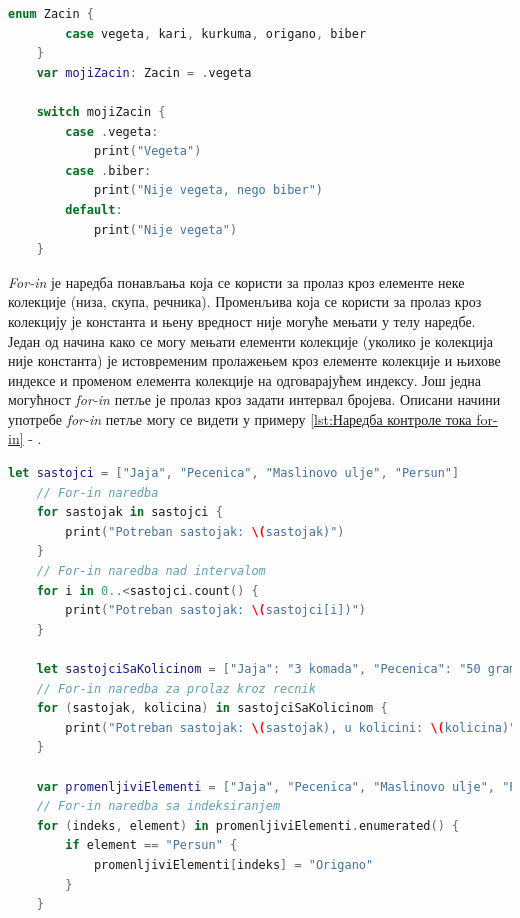 \documentclass[12pt,oneside]{memoir}
\begin{document}
\begin{lstlisting}[caption=\textit{{Наредба контроле тока switch}}, label={lst:Наредба контроле тока switch}, language=Swift, frame=single]
    enum Zacin {
        case vegeta, kari, kurkuma, origano, biber
    }
    var mojiZacin: Zacin = .vegeta
    
    switch mojiZacin {
        case .vegeta:
            print("Vegeta")
        case .biber:
            print("Nije vegeta, nego biber")
        default:
            print("Nije vegeta")
    }
\end{lstlisting}

\indent \textit{For-in} је наредба понављања која се користи за пролаз кроз елементе неке колекције (низа, скупа, речника). Променљива која се користи за пролаз кроз колекцију је константа и њену вредност није могуће мењати у телу наредбе. Један од начина како се могу мењати елементи колекције (уколико је колекција није константа) је истовременим пролажењем кроз елементе колекције и њихове индексе и променом елемента колекције на одговарајућем индексу. Још једна могућност \textit{for-in} петље је пролаз кроз задати интервал бројева. Описани начини употребе \textit{for-in} петље могу се видети у примеру \ref{lst:Наредба контроле тока for-in} - .
\begin{lstlisting}[caption=\textit{{Наредба контроле тока for-in}}, label={lst:Наредба контроле тока for-in}, language=Swift, frame=single]
    let sastojci = ["Jaja", "Pecenica", "Maslinovo ulje", "Persun"]
    // For-in naredba
    for sastojak in sastojci {
        print("Potreban sastojak: \(sastojak)")
    }
    // For-in naredba nad intervalom
    for i in 0..<sastojci.count() {
        print("Potreban sastojak: \(sastojci[i])")
    }
    
    let sastojciSaKolicinom = ["Jaja": "3 komada", "Pecenica": "50 grama", "Maslinovo ulje": "Koliko je potrebno da pokrije tiganj", "Persun": "Prstohvat"]
    // For-in naredba za prolaz kroz recnik
    for (sastojak, kolicina) in sastojciSaKolicinom {
        print("Potreban sastojak: \(sastojak), u kolicini: \(kolicina)")
    }
    
    var promenljiviElementi = ["Jaja", "Pecenica", "Maslinovo ulje", "Persun"]
    // For-in naredba sa indeksiranjem
    for (indeks, element) in promenljiviElementi.enumerated() {
        if element == "Persun" {
            promenljiviElementi[indeks] = "Origano"
        }
    } 
\end{lstlisting}
\end{document}
